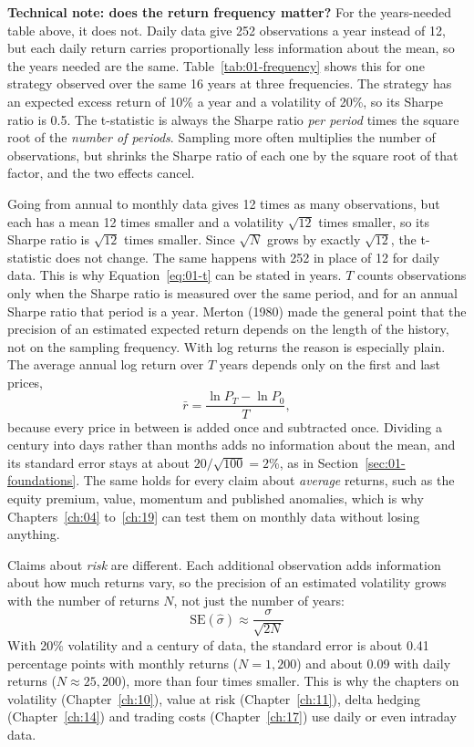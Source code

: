 \begin{technote}
\textbf{Technical note: does the return frequency matter?} For the years-needed table above, it does not. Daily data give 252 observations a year instead of 12, but each daily return carries proportionally less information about the mean, so the years needed are the same. Table~\ref{tab:01-frequency} shows this for one strategy observed over the same 16 years at three frequencies. The strategy has an expected excess return of 10\% a year and a volatility of 20\%, so its Sharpe ratio is 0.5. The t-statistic is always the Sharpe ratio \emph{per period} times the square root of the \emph{number of periods}. Sampling more often multiplies the number of observations, but shrinks the Sharpe ratio of each one by the square root of that factor, and the two effects cancel.


Going from annual to monthly data gives 12 times as many observations, but each has a mean 12 times smaller and a volatility $\sqrt{12}$ times smaller, so its Sharpe ratio is $\sqrt{12}$ times smaller. Since $\sqrt{N}$ grows by exactly $\sqrt{12}$, the t-statistic does not change. The same happens with 252 in place of 12 for daily data. This is why Equation~\eqref{eq:01-t} can be stated in years. $T$ counts observations only when the Sharpe ratio is measured over the same period, and for an annual Sharpe ratio that period is a year. Merton (1980) made the general point that the precision of an estimated expected return depends on the length of the history, not on the sampling frequency. With log returns the reason is especially plain. The average annual log return over $T$ years depends only on the first and last prices,
\begin{equation}
  \bar{r} = \frac{\ln P_T - \ln P_0}{T}, \nonumber
\end{equation}
because every price in between is added once and subtracted once. Dividing a century into days rather than months adds no information about the mean, and its standard error stays at about $20/\sqrt{100} = 2$\%, as in Section~\ref{sec:01-foundations}. The same holds for every claim about \emph{average} returns, such as the equity premium, value, momentum and published anomalies, which is why Chapters~\ref{ch:04} to~\ref{ch:19} can test them on monthly data without losing anything.

Claims about \emph{risk} are different. Each additional observation adds information about how much returns vary, so the precision of an estimated volatility grows with the number of returns $N$, not just the number of years:
\begin{equation}
  \mathrm{SE}(\hat{\sigma}) \approx \frac{\sigma}{\sqrt{2N}} \nonumber
\end{equation}
With 20\% volatility and a century of data, the standard error is about 0.41 percentage points with monthly returns ($N = 1{,}200$) and about 0.09 with daily returns ($N \approx 25{,}200$), more than four times smaller. This is why the chapters on volatility (Chapter~\ref{ch:10}), value at risk (Chapter~\ref{ch:11}), delta hedging (Chapter~\ref{ch:14}) and trading costs (Chapter~\ref{ch:17}) use daily or even intraday data.


\end{technote}
